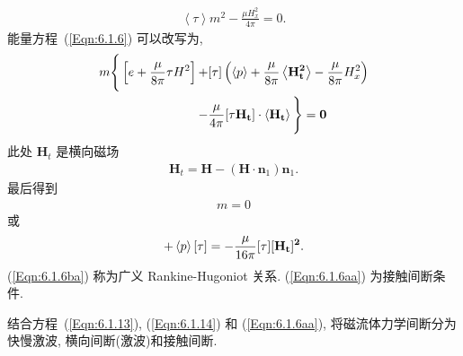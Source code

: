 \documentclass{article}
\begin{document}
\begin{align}
\left<\tau\right> m^2 - \frac{\mu H_x^2}{4\pi} = 0.\label{Eqn:6.1.14}
\end{align}
能量方程~(\ref{Eqn:6.1.6}) 可以改写为,
\begin{align}
m \Bigg\{ \left[ e + \frac{\mu}{8\pi} \tau H^2 \right] +& [\tau] \left( \left<p\right>
+
\frac{\mu}{8\pi} \left<\bf H_t^2\right> - \frac{\mu}{8\pi} H_x^2 \right)
\nonumber\\
-& \frac{\mu}{4\pi} [\tau \bf H_t] \cdot \left< \boldsymbol{H}_t \right> \Bigg\} = 0
\end{align}
此处 $\boldsymbol{H}_t$ 是横向磁场
\begin{eqnarray*}
\boldsymbol{H}_t = \boldsymbol{H} - (\boldsymbol{H} \cdot \boldsymbol{n}_1) \boldsymbol{n}_1.
\end{eqnarray*}
最后得到
\begin{align}
m = 0\label{Eqn:6.1.6aa}
\end{align}
或
\begin{align}
[e] + \left<p\right>[\tau] = -\frac{\mu}{16\pi} [\tau][\bf H_t]^2.\label{Eqn:6.1.6ba}
\end{align}
(\ref{Eqn:6.1.6ba}) 称为广义 Rankine-Hugoniot 关系. (\ref{Eqn:6.1.6aa}) 为接触间断条件.

结合方程~(\ref{Eqn:6.1.13}), (\ref{Eqn:6.1.14}) 和 (\ref{Eqn:6.1.6aa}),
将磁流体力学间断分为快慢激波, 横向间断(激波)和接触间断.
\end{document}
